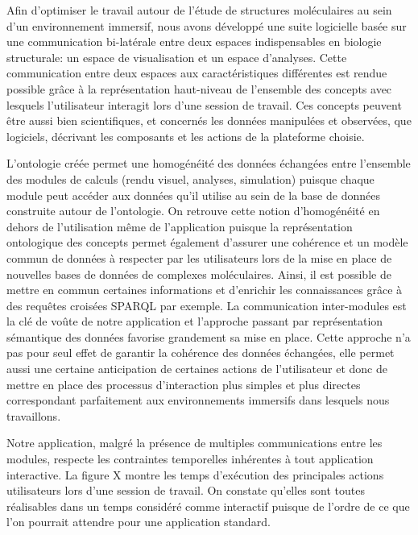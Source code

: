 Afin d'optimiser le travail autour de l'étude de structures moléculaires au sein d'un environnement immersif, nous avons développé une suite logicielle basée sur une communication bi-latérale entre deux espaces indispensables en biologie structurale: un espace de visualisation et un espace d'analyses. Cette communication entre deux espaces aux caractéristiques différentes est rendue possible grâce à la représentation haut-niveau de l'ensemble des concepts avec lesquels l'utilisateur interagit lors d'une session de travail. Ces concepts peuvent être aussi bien scientifiques, et concernés les données manipulées et observées, que logiciels, décrivant les composants et les actions de la plateforme choisie. 

L'ontologie créée permet une homogénéité des données échangées entre l'ensemble des modules de calculs (rendu visuel, analyses, simulation) puisque chaque module peut accéder aux données qu'il utilise au sein de la base de données construite autour de l'ontologie. On retrouve cette notion d'homogénéité en dehors de l'utilisation même de l'application puisque la représentation ontologique des concepts permet également d'assurer une cohérence et un modèle commun de données à respecter par les utilisateurs lors de la mise en place de nouvelles bases de données de complexes moléculaires. Ainsi, il est possible de mettre en commun certaines informations et d'enrichir les connaissances grâce à des requêtes croisées SPARQL par exemple. La communication inter-modules est la clé de voûte de notre application et l'approche passant par représentation sémantique des données favorise grandement sa mise en place. Cette approche n'a pas pour seul effet de garantir la cohérence des données échangées, elle permet aussi une certaine anticipation de certaines actions de l'utilisateur et donc de mettre en place des processus d'interaction plus simples et plus directes correspondant parfaitement aux environnements immersifs dans lesquels nous travaillons.

Notre application, malgré la présence de multiples communications entre les modules, respecte les contraintes temporelles inhérentes à tout application interactive. La figure X montre les temps d'exécution des principales actions utilisateurs lors d'une session de travail. On constate qu'elles sont toutes réalisables dans un temps considéré comme interactif puisque de l'ordre de ce que l'on pourrait attendre pour une application standard.


